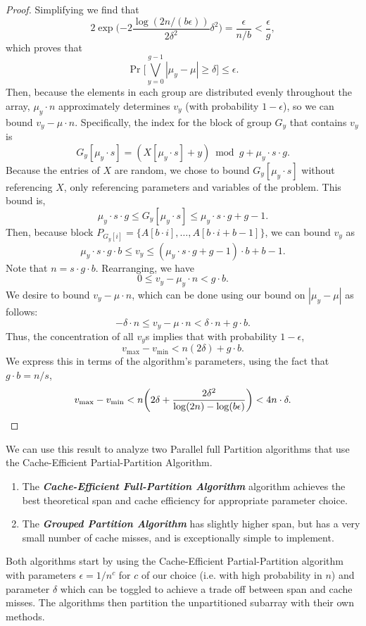 \documentclass[sigconf]{acmart}
\DeclarePairedDelimiter{\paren}{(}{)}
\newcommand{\defn}[1]       {{\textit{\textbf{\boldmath #1}}}}
\theoremstyle{remark}
\theoremstyle{remark}
\begin{document}
\begin{proof}
	Simplifying we find that  
	$$2\exp\Big({-2} \frac{\log (2n/(b\epsilon))}{2\delta^2} \delta^2\Big) = \frac{\epsilon}{n/b} < \frac{\epsilon}{g},$$
	which proves that 
	$$\Pr\Big[\bigvee_{y=0}^{g-1} |\mu_y - \mu| \geq \delta\Big] \leq \epsilon.$$
	Then, because the elements in each group are distributed evenly throughout the array, $\mu_y\cdot n$ approximately determines $v_y$ (with probability $1-\epsilon$), so we can bound $v_y-\mu\cdot n$. 
	Specifically, the index for the block of group $G_y$ that contains $v_y$ is $$G_y[\mu_y\cdot s]= (X[\mu_y \cdot s] + y) \bmod g + \mu_y \cdot s\cdot g.$$
	Because the entries of $X$ are random, we chose to bound $G_y[\mu_y\cdot s]$ without referencing $X$, only referencing parameters and variables of the problem.
	This bound is, 
	$$ \mu_y \cdot s\cdot g \leq G_y[\mu_y\cdot s] \leq  \mu_y \cdot s\cdot g + g-1.$$
	Then, because block $P_{G_y[i]} = \{A[b\cdot i], \ldots, A[b\cdot i + b-1]\}$, we can bound $v_y$ as $$\mu_y\cdot s\cdot g\cdot b \leq v_y \leq (\mu_y \cdot s\cdot g + g-1)\cdot b + b-1.$$
	Note that $n=s\cdot g\cdot b$. 
	Rearranging, we have 
	$$0 \leq v_y - \mu_y\cdot n < g\cdot b.$$
	We desire to bound $v_y - \mu\cdot n$, which can be done using our bound on $|\mu_y - \mu|$ as follows:
	$$ - \delta\cdot n \leq v_y - \mu\cdot n < \delta\cdot n + g\cdot b.$$
	Thus, the concentration of all $v_y$s implies that with probability $1-\epsilon$, 
	$$v_{\text{max}}-v_{\text{min}}<n(2\delta) + g\cdot b.$$ 
	We express this in terms of the algorithm's parameters, using the fact that $g\cdot b = n/s$, 
	$$v_{\text{max}}-v_{\text{min}}<n\paren*{2\delta + \frac{2\delta^2}{\log (2n) - \log(b\epsilon)}} < 4n\cdot\delta.$$ 
\end{proof}
We can use this result to analyze two Parallel full Partition algorithms that use the Cache-Efficient Partial-Partition Algorithm.

\begin{enumerate}
	\item The \defn{Cache-Efficient Full-Partition Algorithm} algorithm achieves the best theoretical span and cache efficiency for appropriate parameter choice.
	\item The \defn{Grouped Partition Algorithm} has slightly higher span, but has a very small number of cache misses, and is exceptionally simple to implement.
\end{enumerate}

Both algorithms start by using the Cache-Efficient Partial-Partition algorithm with parameters $\epsilon = 1/n^c$ for $c$ of our choice (i.e. with high probability in $n$) and parameter $\delta$ which can be toggled to achieve a trade off between span and cache misses. 
The algorithms then partition the unpartitioned subarray with their own methods.
\end{document}
